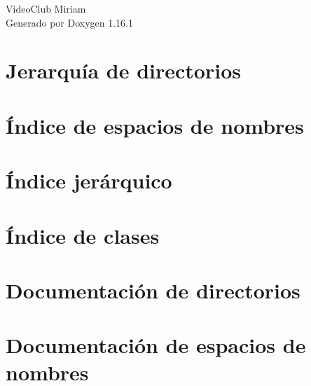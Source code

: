 \documentclass[twoside]{book}
\newcommand{\+}{\discretionary{\mbox{\scriptsize$\hookleftarrow$}}{}{}}
\newcommand{\clearemptydoublepage}{%
    \newpage{\pagestyle{empty}\cleardoublepage}%
  }
\begin{document}
  \raggedbottom
    \hypersetup{pageanchor=false,
                bookmarksnumbered=true,
                pdfencoding=unicode
               }
  \begin{titlepage}
  \vspace*{7cm}
  \begin{center}%
  {\Large Video\+Club Miriam}\\
  \vspace*{1cm}
  {\large Generado por Doxygen 1.16.1}\\
  \end{center}
  \end{titlepage}
  \clearemptydoublepage
  \tableofcontents
  \clearemptydoublepage
  \hypersetup{pageanchor=true}
\chapter{Jerarquía de directorios}

\chapter{Índice de espacios de nombres}

\chapter{Índice jerárquico}

\chapter{Índice de clases}

\chapter{Documentación de directorios}

\chapter{Documentación de espacios de nombres}











\end{document}
